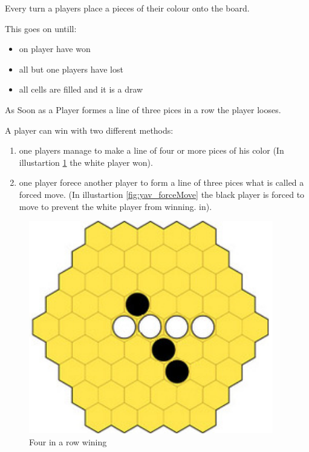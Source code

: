 \documentclass[english]{report}
\begin{document}
Every turn a players place a pieces of their colour onto the board. 

This goes on untill:
\begin{itemize}
	\item on player have won
	\item all but one players have lost
	\item all cells are filled and it is a draw
\end{itemize}

As Soon as a Player formes a line of three pices in a row the player looses.

A player can win with two different methods:
\begin{enumerate}
	\item one players manage to make a line of four or more pices of his color (In illustartion  \ref{fig:yav_4inarow} the white player won).
	\item one player forece another player to form a line of three pices what is called a forced move. (In illustartion  \ref{fig:yav_forceMove} the black player is forced to move to prevent the white player from winning. in).
\end{enumerate}

\begin{figure}[ht]
\centering
\includegraphics[width=0.95\textwidth]{Abbildungen/yav_4inarow.png}
\caption[Four in a row wining, Source:\cite{yvalath}]{Four in a row wining}
\label{fig:yav_4inarow}
\end{figure}
\end{document}
